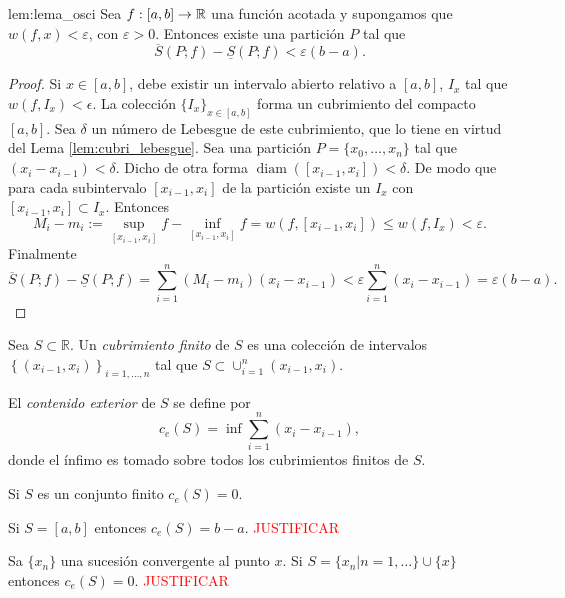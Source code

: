 \begin{lema}{lem:lema_osci} Sea $f:[a,b]\to\mathbb{R}$ una función acotada y supongamos que   $w(f,x)<\varepsilon$, con $\varepsilon>0$. Entonces existe una partición $P$ tal que 
\begin{equation}\label{eq:lema_oscila}
 \overline{S}(P;f)-\underline{S}(P;f)<\varepsilon(b-a).
\end{equation}
 
\end{lema}
\begin{proof} Si $x\in [a,b]$, debe existir un intervalo abierto relativo a $[a,b]$,  $I_x$ tal que $w(f,I_x)<\epsilon$. La colección $\{I_x\}_{x\in [a,b]}$ forma un cubrimiento del compacto $[a,b]$. Sea $\delta$ un número de Lebesgue de este cubrimiento, que lo tiene en virtud del Lema \ref{lem:cubri_lebesgue}. Sea una partición $P=\{x_0,\ldots,x_n\}$ tal que $(x_i-x_{i-1})<\delta$. Dicho de otra forma $\operatorname{diam}( [x_{i-1},x_i])<\delta$. De modo que para cada subintervalo $[x_{i-1},x_i]$ de la partición existe un $I_x$ con $[x_{i-1},x_i]\subset I_x$. Entonces 
\[
 M_i-m_i:=\sup\limits_{[x_{i-1},x_i]} f-\inf\limits_{[x_{i-1},x_i]} f=w(f,[x_{i-1},x_i])\leq w(f,I_x)<\varepsilon.
\]
Finalmente
\[
 \overline{S}(P;f)-\underline{S}(P;f)=\sum_{i=1}^n( M_i-m_i)(x_i-x_{i-1})<\varepsilon\sum_{i=1}^n(x_i-x_{i-1})=\varepsilon(b-a).
\]


 
\end{proof}





 \begin{definicion}{} Sea $S\subset\mathbb{R}$. Un \emph{cubrimiento finito} de $S$ es una colección de intervalos $\left\{ (x_{i-1},x_i)\right\}_{i=1,\ldots,n}$ tal que $S\subset \cup_{i=1}^n(x_{i-1},x_i)$.
 
 El \emph{contenido exterior} de $S$ se define por 
 \[
  c_e(S)=\inf \sum_{i=1}^n (x_i-x_{i-1}),
 \]
donde el ínfimo es tomado sobre todos los cubrimientos finitos de $S$.
  
 \end{definicion}
 
 \begin{ejemplo}{} Si $S$ es un conjunto finito $c_e(S)=0$.
  
 \end{ejemplo}

 \begin{ejemplo}{} Si $S=[a,b]$ entonces  $c_e(S)=b-a$. \textcolor{red}{JUSTIFICAR}
    
 \end{ejemplo}
 \begin{ejemplo}{} Sa $\{x_n\}$ una sucesión convergente al punto $x$. Si $S=\{x_n| n=1,\dots\}\cup\{x\}$ entonces  $c_e(S)=0$. \textcolor{red}{JUSTIFICAR}
    
 \end{ejemplo}
 
